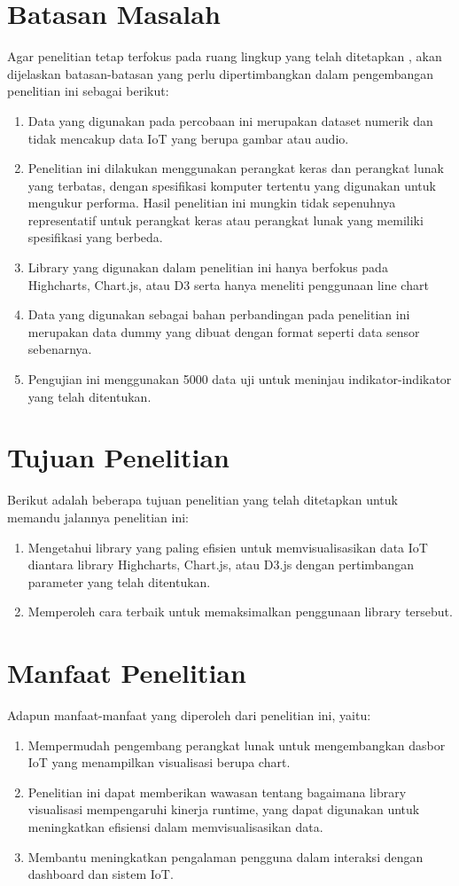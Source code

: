{\section{Batasan Masalah}
Agar penelitian tetap terfokus pada ruang lingkup yang telah ditetapkan \cite{muhammadred}, akan dijelaskan batasan-batasan yang perlu dipertimbangkan dalam pengembangan penelitian ini sebagai berikut:
\begin{enumerate}
    \item Data yang digunakan pada percobaan ini merupakan dataset numerik dan tidak mencakup data IoT yang berupa gambar atau audio. 
    \item Penelitian ini dilakukan menggunakan perangkat keras dan perangkat lunak yang terbatas, dengan spesifikasi komputer tertentu yang digunakan untuk mengukur performa. Hasil penelitian ini mungkin tidak sepenuhnya representatif untuk perangkat keras atau perangkat lunak yang memiliki spesifikasi yang berbeda.
    \item Library yang digunakan dalam penelitian ini hanya berfokus pada Highcharts, Chart.js, atau D3 serta hanya meneliti penggunaan line chart
    \item Data yang digunakan sebagai bahan perbandingan pada penelitian ini merupakan data dummy yang dibuat dengan format seperti data sensor sebenarnya.
    \item Pengujian ini menggunakan 5000 data uji untuk meninjau indikator-indikator yang telah ditentukan. 
\end{enumerate}

\section{Tujuan Penelitian}
Berikut adalah beberapa tujuan penelitian yang telah ditetapkan untuk memandu jalannya penelitian ini: 
\begin{enumerate}
    \item Mengetahui library yang paling efisien untuk memvisualisasikan data IoT diantara library Highcharts, Chart.js, atau D3.js dengan pertimbangan parameter yang telah ditentukan.
    \item Memperoleh cara terbaik untuk memaksimalkan penggunaan library tersebut.
\end{enumerate}

\section{Manfaat Penelitian}
Adapun manfaat-manfaat yang diperoleh dari penelitian ini, yaitu:
\begin{enumerate}
    \item Mempermudah pengembang perangkat lunak untuk mengembangkan dasbor IoT yang menampilkan visualisasi berupa chart. 
    \item Penelitian ini dapat memberikan wawasan tentang bagaimana library visualisasi mempengaruhi kinerja runtime, yang dapat digunakan untuk meningkatkan efisiensi dalam memvisualisasikan data.
    \item Membantu meningkatkan pengalaman pengguna dalam interaksi dengan dashboard dan sistem IoT.
\end{enumerate}

}
